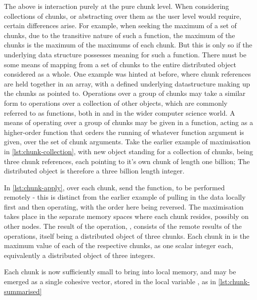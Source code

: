 The above is interaction purely at the pure chunk level. When
considering collections of chunks, or abstracting over them as the user
level would require, certain differences arise. For example, when
seeking the maximum of a set of chunks, due to the transitive nature of
such a function, the maximum of the chunks is the maximum of the
maximums of each chunk. But this is only so if the underlying data
structure possesses meaning for such a function. There must be some
means of mapping from a set of chunks to the entire distributed object
considered as a whole. One example was hinted at before, where chunk
references are held together in an array, with a defined underlying
datastructure making up the chunks as pointed to. Operations over a
group of chunks may take a similar form to operations over a collection
of other objects, which are commonly referred to as 
functions, both in \R and in the wider computer science world. A means of
operating over a group of chunks may be given in a 
function, acting as a higher-order function that orders the running of
whatever function argument is given, over the set of chunk arguments.
Take the earlier example of maximisation in \cref{lst:chunk-collection}, with new object 
standing for a collection of chunks, being three chunk references, each
pointing to it's own chunk of length one billion; The distributed object
is therefore a three billion length integer.


In \cref{lst:chunk-apply}, over each chunk, send the  function, to be performed
remotely - this is distinct from the earlier example of pulling in the
data locally first and then operating, with the order here being
reversed. The maximisation takes place in the separate memory spaces
where each chunk resides, possibly on other nodes. The result of the
operation, , consists of the remote results of the
operations, itself being a distributed object of three chunks. Each
chunk in  is the maximum value of each of the respective
 chunks, as one scalar integer each, equivalently a
distributed object of three integers.


Each chunk is now sufficiently small to bring into local memory, and may
be emerged as a single cohesive vector, stored in the local variable
, as in \cref{lst:chunk-summarised}

